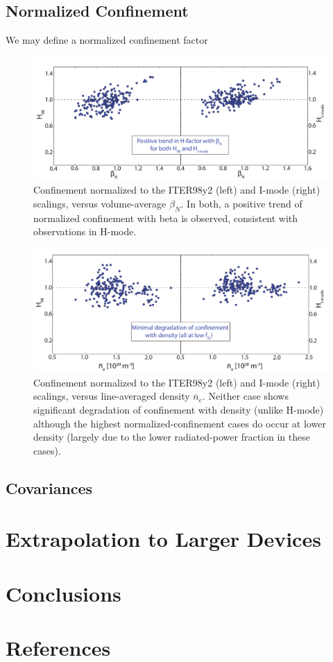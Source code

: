 \documentclass[12pt]{iopart}
\begin{document}
\subsection{Normalized Confinement}\label{subsec:norm}

We may define a normalized confinement factor

\begin{figure}[ht]
 \includegraphics[width=\textwidth]{betaN_H.pdf}
 \caption{Confinement normalized to the ITER98y2 (left) and I-mode (right) scalings, versus volume-average $\beta_N$.  In both, a positive trend of normalized confinement with beta is observed, consistent with observations in H-mode.}
 \label{fig:betaN_H}
\end{figure}

\begin{figure}[ht]
 \includegraphics[width=\textwidth]{nebar_H.pdf}
 \caption{Confinement normalized to the ITER98y2 (left) and I-mode (right) scalings, versus line-averaged density $\overline{n}_e$.  Neither case shows significant degradation of confinement with density (unlike H-mode) although the highest normalized-confinement cases do occur at lower density (largely due to the lower radiated-power fraction in these cases).}
 \label{fig:nebar_H}
\end{figure}

\subsection{Covariances}\label{subsec:covar}

\section{Extrapolation to Larger Devices}\label{sec:extrap}

\section{Conclusions}\label{sec:conclusion}

\section*{References}


\end{document}
